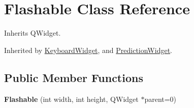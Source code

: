 \hypertarget{class_flashable}{\section{Flashable Class Reference}
\label{class_flashable}
}


Inherits Q\-Widget.



Inherited by \hyperlink{class_keyboard_widget}{Keyboard\-Widget}, and \hyperlink{class_prediction_widget}{Prediction\-Widget}.

\subsection*{Public Member Functions}
\begin{DoxyCompactItemize}
\item 
\hypertarget{class_flashable_a6141ee971a304aff9ca2af46beef9aeb}{{\bfseries Flashable} (int width, int height, Q\-Widget $\ast$parent=0)}\label{class_flashable_a6141ee971a304aff9ca2af46beef9aeb}


\end{DoxyCompactItemize}
